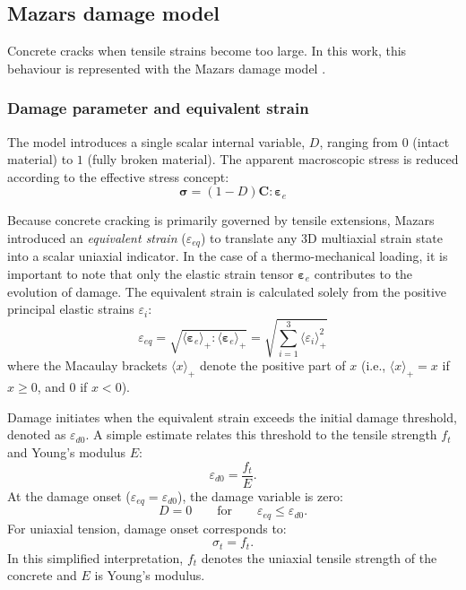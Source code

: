 \documentclass[a4paper,12pt,twoside]{report}     %
\begin{document}
\subsection{Mazars damage model}

Concrete cracks when tensile strains become too large. In this work, this behaviour is represented with the Mazars damage model \cite{hamon_model_2013}. 

\subsubsection{Damage parameter and equivalent strain}
The model introduces a single scalar internal variable, $D$, ranging from $0$ (intact material) to $1$ (fully broken material). The apparent macroscopic stress is reduced according to the effective stress concept:
\begin{equation}
    \boldsymbol{\sigma} = (1 - D) \mathbf{C} : \boldsymbol{\varepsilon}_e
\end{equation}

Because concrete cracking is primarily governed by tensile extensions, Mazars introduced an \textit{equivalent strain} ($\varepsilon_{eq}$) to translate any 3D multiaxial strain state into a scalar uniaxial indicator. In the case of a thermo-mechanical loading, it is important to note that only the elastic strain tensor $\boldsymbol{\varepsilon}_e$ contributes to the evolution of damage. The equivalent strain is calculated solely from the positive principal elastic strains $\varepsilon_i$:
\begin{equation}
    \varepsilon_{eq} = \sqrt{ \langle \boldsymbol{\varepsilon}_e \rangle_+ : \langle \boldsymbol{\varepsilon}_e \rangle_+} = \sqrt{ \sum_{i=1}^{3} \langle \varepsilon_i \rangle_+^2 }
\end{equation}
where the Macaulay brackets $\langle x \rangle_+$ denote the positive part of $x$ (i.e., $\langle x \rangle_+ = x$ if $x \ge 0$, and $0$ if $x < 0$). 

Damage initiates when the equivalent strain exceeds the initial damage threshold, denoted as $\varepsilon_{d0}$. A simple estimate relates this threshold to the tensile strength $f_t$ and Young's modulus $E$:
\begin{equation}
    \varepsilon_{d0} = \frac{f_t}{E}.
\end{equation}
\noindent At the damage onset ($\varepsilon_{eq}=\varepsilon_{d0}$), the damage variable is zero:
\begin{equation}
    D = 0 \qquad \text{for} \qquad \varepsilon_{eq} \le \varepsilon_{d0}.
\end{equation}
\noindent For uniaxial tension, damage onset corresponds to:
\begin{equation}
    \sigma_t = f_t.
\end{equation}
\noindent In this simplified interpretation, $f_t$ denotes the uniaxial tensile strength of the concrete and $E$ is Young's modulus.
\end{document}
